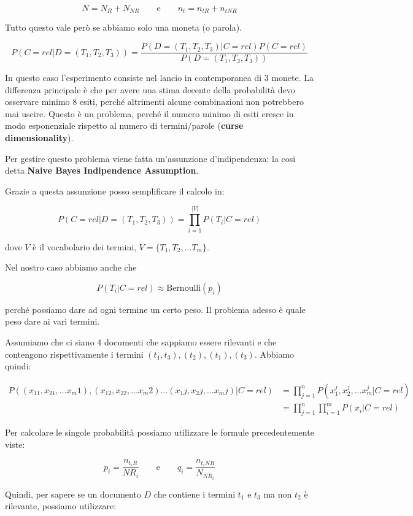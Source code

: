 $$
N = N_R + N_{NR} \qquad \text{e} \qquad n_t = n_{tR} + n_{tNR}
$$

\noindent Tutto questo vale però se abbiamo solo una moneta (o parola).

$$
P(C = rel | D=(T_1, T_2, T_3)) = \frac{P(D=(T_1,T_2, T_3) | C=rel)P(C=rel)}{P(D=(T_1, T_2, T_3))}
$$

\noindent In questo caso l'esperimento consiste nel lancio in contemporanea di 3 monete.
La differenza principale è che per avere una stima decente della probabilità devo osservare minimo 8 esiti, perché altrimenti alcune combinazioni non potrebbero mai uscire.
Questo è un problema, perché il numero minimo di esiti cresce in modo esponenziale rispetto al numero di termini/parole (\textbf{curse dimensionality}).

Per gestire questo problema viene fatta un'assunzione d'indipendenza: la cosi detta \textbf{Naive Bayes Indipendence Assumption}.

Grazie a questa assunzione posso semplificare il calcolo in:

$$
P(C = rel | D=(T_1, T_2, T_3)) = \prod\limits_{i = 1}^{|V|}P(T_i|C=rel)
$$

\noindent dove $V$ è il vocabolario dei termini, $V = \{ T_1, T_2, \ldots T_m\}$.

Nel nostro caso abbiamo anche che

$$
P(T_i|C=rel) \approx \text{Bernoulli}(p_i)
$$

\noindent perché possiamo dare ad ogni termine un certo peso.
Il problema adesso è quale peso dare ai vari termini.

Assumiamo che ci siano 4 documenti che sappiamo essere rilevanti e che contengono rispettivamente i termini $(t_1, t_3), (t_2), (t_1), (t_3)$. Abbiamo quindi:

\begin{align*}
P((x_11, x_21,\ldots x_m1),(x_12, x_22,\ldots x_m2)\ldots (x_1j, x_2j,\ldots x_mj) | C=rel) &= \prod\limits_{j=1}^n P(x_{1}^j,x_{2}^j,\ldots x_{m}^j|C=rel) \\
&= \prod\limits_{j=1}^n \prod\limits_{i=1}^m P(x_i | C=rel)
\end{align*}


\noindent Per calcolare le singole probabilità possiamo utilizzare le formule precedentemente viste:

$$
p_i = \frac{n_{t_iR}}{NR_i} \qquad \text{e} \qquad q_i = \frac{n_{t_iNR}}{N_{NR_i}}
$$

\noindent Quindi, per sapere se un documento $D$ che contiene i termini $t_1$ e $t_3$ ma non $t_2$ è rilevante, possiamo utilizzare:


